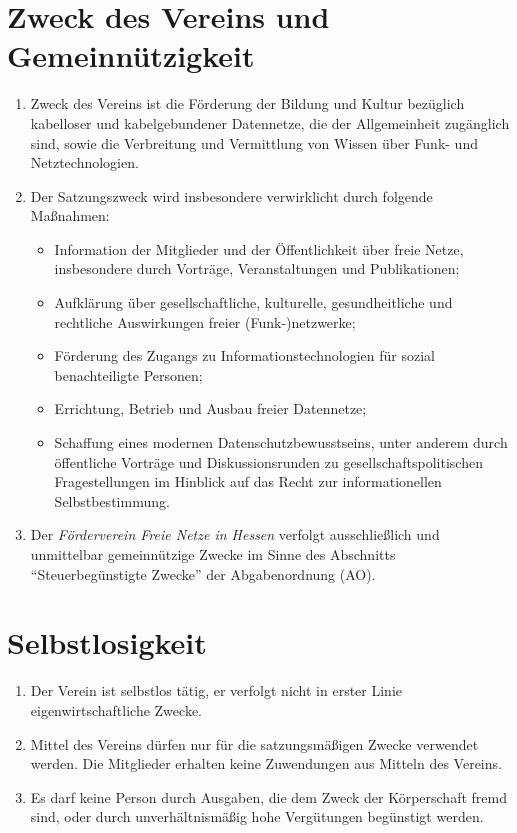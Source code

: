 \documentclass[ngerman]{article}
\newcommand{\NameVerein}{Förderverein Freie Netze in Hessen}
\begin{document}
\section{Zweck des Vereins und Gemeinnützigkeit}
\begin{enumerate}
  \item Zweck des Vereins ist die Förderung der Bildung und Kultur bezüglich kabelloser und kabelgebundener Datennetze, die der Allgemeinheit zugänglich sind, sowie die Verbreitung und Vermittlung von Wissen über Funk- und Netztechnologien.
  \item Der Satzungszweck wird insbesondere verwirklicht durch folgende Maßnahmen:
  \begin{itemize}
    \item Information der Mitglieder und der Öffentlichkeit über freie Netze, insbesondere durch Vorträge, Veranstaltungen und Publikationen;
    \item Aufklärung über gesellschaftliche, kulturelle, gesundheitliche und rechtliche Auswirkungen freier (Funk-)netzwerke;
    \item Förderung des Zugangs zu Informationstechnologien für sozial benachteiligte Personen;
    \item Errichtung, Betrieb und Ausbau freier Datennetze;
    \item Schaffung eines modernen Datenschutzbewusstseins, unter anderem durch öffentliche Vorträge und Diskussionsrunden zu gesellschaftspolitischen Fragestellungen im Hinblick auf das Recht zur informationellen Selbstbestimmung.
  \end{itemize}
  \item Der \emph{\NameVerein} verfolgt ausschließlich und unmittelbar gemeinnützige Zwecke im Sinne des Abschnitts "`Steuerbegünstigte Zwecke"' der Abgabenordnung (AO).
\end{enumerate}


\section{Selbstlosigkeit}
\begin{enumerate}
  \item Der Verein ist selbstlos tätig, er verfolgt nicht in erster Linie eigenwirtschaftliche Zwecke.
  \item Mittel des Vereins dürfen nur für die satzungsmäßigen Zwecke verwendet werden. Die Mitglieder erhalten keine Zuwendungen aus Mitteln des Vereins.
  \item Es darf keine Person durch Ausgaben, die dem Zweck der Körperschaft fremd sind, oder durch unverhältnismäßig hohe Vergütungen begünstigt werden.
\end{enumerate}
\end{document}
